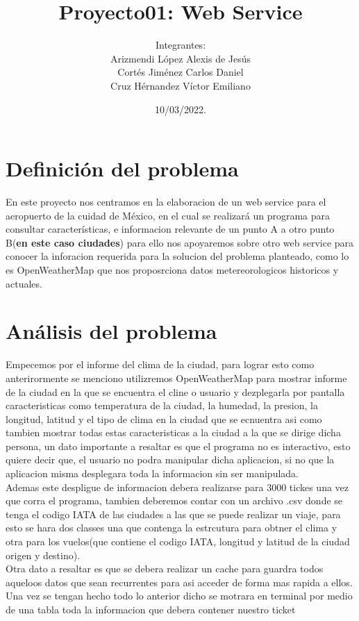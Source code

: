 \documentclass[30pt]{article}
\title{Proyecto01: Web Service}
\author{Integrantes:\\
    Arizmendi López Alexis de Jesús\\
    Cortés Jiménez Carlos Daniel\\
    Cruz Hérnandez Víctor Emiliano}
\date{10/03/2022.}
\theoremstyle{definition}
\begin{document}
\maketitle

\section{\LARGE Definición del problema}

{\large En este proyecto nos centramos en la elaboracion de un web service para el aeropuerto de la cuidad de México, en el cual se realizará un programa para consultar características, e informacion relevante de un punto A a otro punto B(\textbf{en este caso ciudades}) para ello nos apoyaremos sobre otro web service para conocer la inforacion requerida para la solucion del problema planteado, como lo es OpenWeatherMap que nos proposrciona datos metereorologicos historicos y actuales.} 


\section{Análisis del problema}

{\large Empecemos por el informe del clima de la ciudad, para lograr esto como anterirormente se menciono utilizremos OpenWeatherMap para mostrar informe de la ciudad en la que se encuentra el cline o usuario y dezplegarla por pantalla caracteristicas como temperatura de la ciudad, la humedad, la presion, la longitud, latitud y el tipo de clima en la ciudad que se ecnuentra asi como tambien mostrar todas estas caracteristicas a la ciudad a la que se dirige dicha persona, un dato importante a resaltar es que el programa no es interactivo, esto quiere decir que, el usuario no podra manipular dicha aplicacion, si no que la aplicacion misma desplegara toda la informacion sin ser manipulada.\\
Ademas este despligue de informacion debera realizarse para 3000 tickes una vez que corra el programa, tambien deberemos contar con un archivo .csv donde se tenga el codigo IATA de las ciudades a las que se puede realizar un viaje, para esto se hara dos classes una que contenga la estrcutura para obtner el clima y otra para los vuelos(que contiene el codigo IATA, longitud y latitud de la ciudad origen y destino).\\
Otra dato a resaltar es que se debera realizar un cache para guardra todos aqueloos datos que sean recurrentes para asi acceder de forma mas rapida a ellos.
Una vez se tengan hecho todo lo anterior dicho se motrara en terminal por medio de una tabla toda la informacion que debera contener nuestro ticket} 
\end{document}
